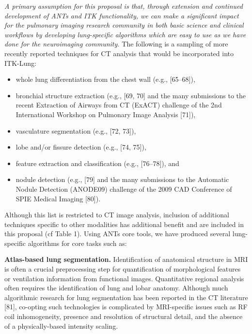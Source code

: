 \documentclass[11pt,]{article}
\begin{document}
\emph{A primary assumption for this proposal is that, through extension
and continued development of ANTs and ITK functionality, we can make a
significant impact for the pulmonary imaging research community in both
basic science and clinical workflows by developing lung-specific
algorithms which are easy to use as we have done for the neuroimaging
community.} The following is a sampling of more recently reported
techniques for CT analysis that would be incorporated into ITK-Lung:

\begin{itemize}
\itemsep1pt\parskip0pt
\item
  whole lung differentiation from the chest wall (e.g., {[}65--68{]}),
\item
  bronchial structure extraction (e.g., {[}69, 70{]} and the many
  submissions to the recent Extraction of Airways from CT (ExACT)
  challenge of the 2nd International Workshop on Pulmonary Image
  Analysis {[}71{]}),
\item
  vasculature segmentation (e.g., {[}72, 73{]}),
\item
  lobe and/or fissure detection (e.g., {[}74, 75{]}),
\item
  feature extraction and classification (e.g., {[}76--78{]}), and
\item
  nodule detection (e.g., {[}79{]} and the many submissions to the
  Automatic Nodule Detection (ANODE09) challenge of the 2009 CAD
  Conference of SPIE Medical Imaging {[}80{]}).
\end{itemize}

Although this list is restricted to CT image analysis, inclusion of
additional techniques specific to other modalities has additional
benefit and are included in this proposal (cf Table 1). Using ANTs core
tools, we have produced several lung-specific algorithms for core tasks
such as:



\textbf{Atlas-based lung segmentation.} Identification of anatomical
structure in MRI is often a crucial preprocessing step for
quantification of morphological features or ventilation information from
functional images. Quantitative regional analysis often requires the
identification of lung and lobar anatomy. Although much algorithmic
research for lung segmentation has been reported in the CT literature
{[}81{]}, co-opting such technologies is complicated by MRI-specific
issues such as RF coil inhomogeneity, presence and resolution of
structural detail, and the absence of a physically-based intensity
scaling.
\end{document}
